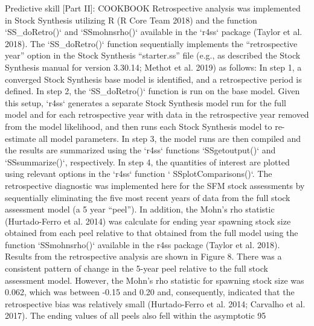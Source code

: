 Predictive skill [Part II]: COOKBOOK 
Retrospective analysis was implemented in Stock Synthesis utilizing R (R Core Team 2018) and the function `SS_doRetro()` and `SSmohnsrho()` available in the `r4ss` package (Taylor et al. 2018). The `SS_doRetro()` function sequentially implements the “retrospective year” option in the Stock Synthesis “starter.ss” file (e.g., as described the Stock Synthesis manual for version 3.30.14; Methot et al. 2019) as follows: In step 1, a converged Stock Synthesis base model is identified, and a retrospective period is defined. In step 2, the `SS_doRetro()` function is run on the base model. Given this setup, `r4ss` generates a separate Stock Synthesis model run for the full model and for each retrospective year with data in the retrospective year removed from the model likelihood, and then runs each Stock Synthesis model to re-estimate all model parameters. In step 3, the model runs are then compiled and the results are summarized using the `r4ss` functions `SSgetoutput()` and `SSsummarize()`, respectively.  In step 4, the quantities of interest are plotted using relevant options in the `r4ss` function ` SSplotComparisons()`. The retrospective diagnostic was implemented here for the SFM stock assessments by sequentially eliminating the five most recent years of data from the full stock assessment model (a 5 year “peel”). In addition, the Mohn’s rho statistic (Hurtado-Ferro et al. 2014) was calculate  for ending year spawning stock size obtained from each peel relative to that obtained from the full model using the function `SSmohnsrho()` available in the r4ss package (Taylor et al. 2018). 
Results from the retrospective analysis are shown in Figure 8. There was a consistent pattern of change in the 5-year peel relative to the full stock assessment model. However, the Mohn’s rho statistic for spawning stock size was 0.062, which was between -0.15 and 0.20 and, consequently, indicated that the retrospective bias was relatively small (Hurtado-Ferro et al. 2014; Carvalho et al. 2017). The ending values of all peels also fell within the asymptotic 95%
